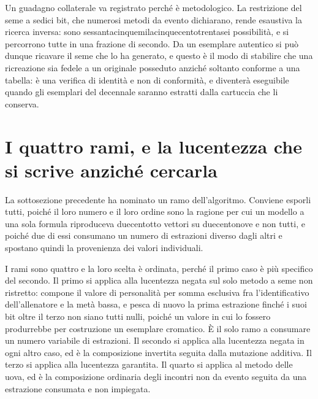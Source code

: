 Un guadagno collaterale va registrato perché è metodologico. La restrizione del seme a sedici bit, che numerosi metodi da evento dichiarano, rende esaustiva la ricerca inversa: sono sessantacinquemilacinquecentotrentasei possibilità, e si percorrono tutte in una frazione di secondo. Da un esemplare autentico si può dunque ricavare il seme che lo ha generato, e questo è il modo di stabilire che una ricreazione sia fedele a un originale posseduto anziché soltanto conforme a una tabella: è una verifica di identità e non di conformità, e diventerà eseguibile quando gli esemplari del decennale saranno estratti dalla cartuccia che li conserva.

\section{I quattro rami, e la lucentezza che si scrive anziché cercarla}

La sottosezione precedente ha nominato un ramo dell'algoritmo. Conviene esporli tutti, poiché il loro numero e il loro ordine sono la ragione per cui un modello a una sola formula riproduceva duecentotto vettori su duecentonove e non tutti, e poiché due di essi consumano un numero di estrazioni diverso dagli altri e spostano quindi la provenienza dei valori individuali.

I rami sono quattro e la loro scelta è ordinata, perché il primo caso è più specifico del secondo. Il primo si applica alla lucentezza negata sul solo metodo a seme non ristretto: compone il valore di personalità per somma esclusiva fra l'identificativo dell'allenatore e la metà bassa, e pesca di nuovo la prima estrazione finché i suoi bit oltre il terzo non siano tutti nulli, poiché un valore in cui lo fossero produrrebbe per costruzione un esemplare cromatico. È il solo ramo a consumare un numero variabile di estrazioni. Il secondo si applica alla lucentezza negata in ogni altro caso, ed è la composizione invertita seguita dalla mutazione additiva. Il terzo si applica alla lucentezza garantita. Il quarto si applica al metodo delle uova, ed è la composizione ordinaria degli incontri non da evento seguita da una estrazione consumata e non impiegata.

